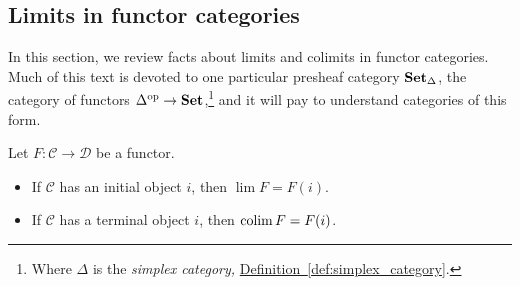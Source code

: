 \documentclass[main.tex]{subfiles}
\begin{document}
\subsection{Limits in functor categories}
\label{ssc:limits_in_functor_categories}

In this section, we review facts about limits and colimits in functor categories. Much of this text is devoted to one particular presheaf category $\operatorname{\mathbf{Set}_{\Delta}}$, the category of functors $\Delta^{\mathrm{op}} \to \mathbf{Set}$,\footnote{Where $\Delta$ is the \emph{simplex category,} \hyperref[def:simplex_category]{Definition~\ref*{def:simplex_category}}.} and it will pay to understand categories of this form.

\begin{fact}
  \label{thm:limit_over_category_with_initial_object_is_that}
  Let $F\colon \mathcal{C} \to \mathcal{D}$ be a functor.

  \begin{itemize}
    \item If $\mathcal{C}$ has an initial object $i$, then $\lim F = F(i)$.

    \item If $\mathcal{C}$ has a terminal object $i$, then $\operatorname*{colim} F = F(i)$.
  \end{itemize}
\end{fact}
%
%
\end{document}
